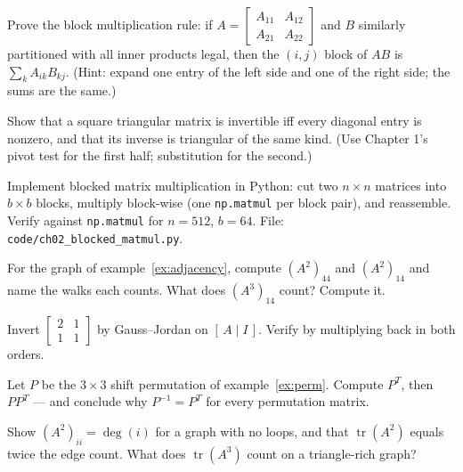 \begin{exercise}[hard]
Prove the block multiplication rule: if $A=\begin{bmatrix}A_{11}&A_{12}\\A_{21}&A_{22}\end{bmatrix}$ and $B$ similarly partitioned with all inner products legal, then the $(i,j)$ block of $AB$ is $\sum_k A_{ik}B_{kj}$. (Hint: expand one entry of the left side and one of the right side; the sums are the same.)
\end{exercise}
\begin{exercise}[hard]
Show that a square triangular matrix is invertible iff every diagonal entry is nonzero, and that its inverse is triangular of the same kind. (Use Chapter 1's pivot test for the first half; substitution for the second.)
\end{exercise}
\begin{exercise}[hard]
Implement blocked matrix multiplication in Python: cut two $n\times n$ matrices into $b\times b$ blocks, multiply block-wise (one \texttt{np.matmul} per block pair), and reassemble. Verify against \texttt{np.matmul} for $n=512$, $b=64$. File: \texttt{code/ch02\_blocked\_matmul.py}.
\end{exercise}
\begin{exercise}[easy]
For the graph of example~\ref{ex:adjacency}, compute $(A^2)_{44}$ and
$(A^2)_{14}$ and name the walks each counts. What does $(A^3)_{14}$
count? Compute it.
\end{exercise}
\begin{exercise}[medium]
Invert $\begin{bmatrix}2&1\\1&1\end{bmatrix}$ by Gauss--Jordan on
$[\,A\mid I\,]$. Verify by multiplying back in both orders.
\end{exercise}
\begin{exercise}[medium]
Let $P$ be the $3\times3$ shift permutation of example~\ref{ex:perm}.
Compute $P^{T}$, then $PP^{T}$ --- and conclude why $P^{-1}=P^{T}$ for
every permutation matrix.
\end{exercise}
\begin{exercise}[hard]
Show $(A^2)_{ii}=\deg(i)$ for a graph with no loops, and that
$\operatorname{tr}(A^2)$ equals twice the edge count. What does
$\operatorname{tr}(A^3)$ count on a triangle-rich graph?
\end{exercise}
